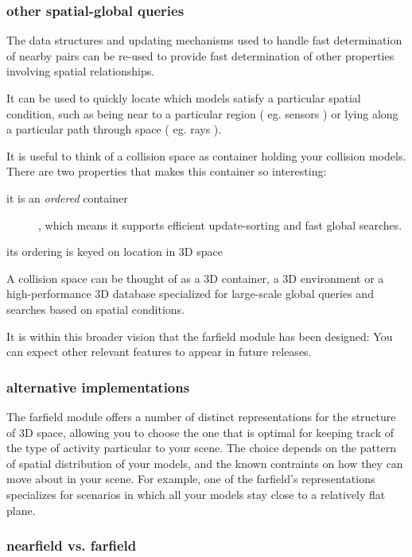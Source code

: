 \documentclass[11pt]{article}
\begin{document}
\subsubsection{ other spatial-global queries }

The data structures and updating mechanisms used to handle fast
determination of nearby pairs can be re-used to provide fast determination
of other properties involving spatial relationships.

It can be used to quickly 
locate which models satisfy a particular spatial condition, such as being
near to a particular region ( eg. sensors ) or lying along a particular
path through space ( eg. rays ). 

It is useful to think of a collision space as container holding your
collision models. There are two properties that makes this container so
interesting:
\begin{description}
\item[it is an \emph{ordered} container], which means it supports efficient
update-sorting and fast global searches.
\item[its ordering is keyed on location in 3D space]
\end{description}
A collision space can be thought of as a 3D container, a 3D environment or a high-performance 3D database specialized for large-scale global queries and searches based on spatial conditions.

It is within this broader vision that the farfield module has been
designed: You can expect other relevant features to appear in future releases.

\subsubsection{ alternative implementations }

The farfield module offers 
a number of distinct representations for the
structure of 3D space, allowing you to choose the one that is optimal for
keeping track of the type of activity particular to your scene.
The choice depends on the pattern of spatial distribution of your models,
and the known contraints on how they can move about in your scene.
For example, one of the farfield's representations specializes for
scenarios in which all your models stay close to a relatively
flat plane.

\subsubsection{ nearfield vs. farfield }
\end{document}
